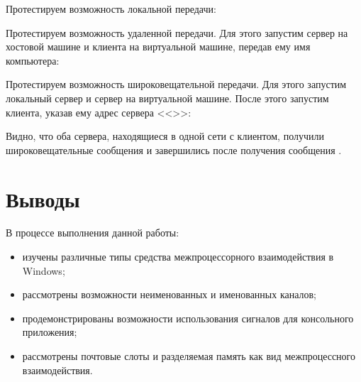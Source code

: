 



Протестируем возможность локальной передачи:





Протестируем возможность удаленной передачи. Для этого запустим сервер на хостовой машине и клиента на виртуальной машине, передав ему имя компьютера:





Протестируем возможность широковещательной передачи. Для этого запустим локальный сервер и сервер на виртуальной машине. После этого запустим клиента, указав ему адрес сервера <<\code{*}>>:







Видно, что оба сервера, находящиеся в одной сети с клиентом, получили широковещательные сообщения и завершились после получения сообщения .

\section{Выводы}

В процессе выполнения данной работы:

\begin{itemize}
	\item изучены различные типы средства межпроцессорного взаимодействия в Windows;
	\item рассмотрены возможности неименованных и именованных каналов;
	\item продемонстрированы возможности использования сигналов для консольного приложения; 
	\item рассмотрены почтовые слоты и разделяемая память как вид межпроцессного взаимодействия.
\end{itemize}

